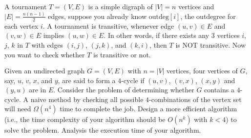 \begin{Exercise}
A tournament $T = (V, E)$ is a simple digraph of $|V| = n$ vertices and $|E| = \frac{n(n-1)}{2}$ edges, suppose you already know $\text{outdeg}[i]$, the outdegree for each vertex $i$. A tournament is transitive, whenever edge $(u, v) \in E$ and $(v, w) \in E$ implies $(u, w) \in E$. In other words, if there exists any $3$ vertices $i$, $j$, $k$ in $T$ with edges $(i, j)$, $(j, k)$, and $(k, i)$, then $T$ is NOT transitive. Now you want to check whether $T$ is transitive or not. 
\end{Exercise}
\begin{Answer}
\end{Answer}


\begin{Exercise}
Given an undirected graph $G = (V, E)$ with $n = |V|$ vertices, four vertices of $G$, say, $u$, $v$, $x$, and $y$, are said to form a $4$-cycle if $(u, v)$, $(v, x)$, $(x, y)$ and $(y, u)$ are in $E$. Consider the problem of determining whether $G$ contains a $4$-cycle. A naive method by checking all possible $4$-combinations of the vertex set will need $\Omega(n^4)$ time to complete the job. Design a more efficient algorithm (i.e., the time complexity of your algorithm should be $O(n^k)$ with $k < 4$) to solve the problem. Analysis the execution time of your algorithm. 
\end{Exercise}
\begin{Answer}
\end{Answer}


\printbibliography[heading=subbibliography]
